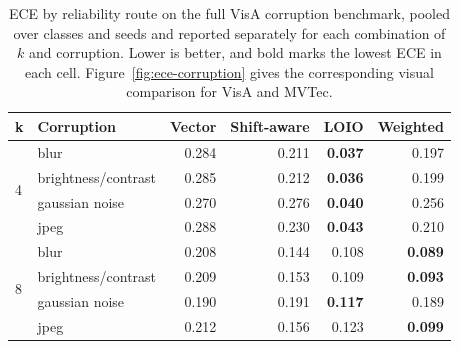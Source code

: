 \begin{table}[pos=t]
\centering
\caption{ECE by reliability route on the full VisA corruption benchmark, pooled over classes and seeds and reported separately for each combination of $k$ and corruption. Lower is better, and bold marks the lowest ECE in each cell. Figure~\ref{fig:ece-corruption} gives the corresponding visual comparison for VisA and MVTec.}
\label{tab:visa-ece-corruption}
\footnotesize
\begin{tabular}{llrrrr}
\toprule
k & Corruption & Vector & Shift-aware & LOIO & Weighted \\
\midrule
\multirow{4}{*}{4} & blur & 0.284 & 0.211 & \textbf{0.037} & 0.197 \\
 & brightness/contrast & 0.285 & 0.212 & \textbf{0.036} & 0.199 \\
 & gaussian noise & 0.270 & 0.276 & \textbf{0.040} & 0.256 \\
 & jpeg & 0.288 & 0.230 & \textbf{0.043} & 0.210 \\
\midrule
\multirow{4}{*}{8} & blur & 0.208 & 0.144 & 0.108 & \textbf{0.089} \\
 & brightness/contrast & 0.209 & 0.153 & 0.109 & \textbf{0.093} \\
 & gaussian noise & 0.190 & 0.191 & \textbf{0.117} & 0.189 \\
 & jpeg & 0.212 & 0.156 & 0.123 & \textbf{0.099} \\
\bottomrule
\end{tabular}
\end{table}
